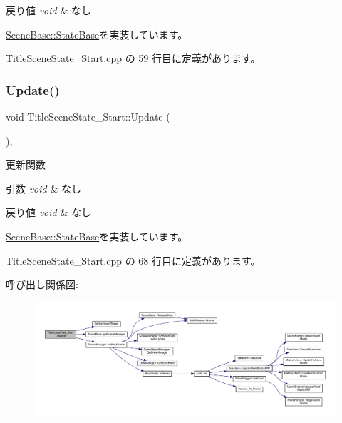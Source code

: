 \begin{DoxyRetVals}{戻り値}
{\em void} & なし \\
\hline
\end{DoxyRetVals}


\mbox{\hyperlink{class_scene_base_1_1_state_base_a2763fa37e45b39bd8d3bbb735c76c59b}{Scene\+Base\+::\+State\+Base}}を実装しています。



 Title\+Scene\+State\+\_\+\+Start.\+cpp の 59 行目に定義があります。

\mbox{\label{class_title_scene_state___start_a2e98cf6810711b58766d7147168d02eb}} 
\subsubsection{\texorpdfstring{Update()}{Update()}}
{\footnotesize\ttfamily void Title\+Scene\+State\+\_\+\+Start\+::\+Update (\begin{DoxyParamCaption}{ }\end{DoxyParamCaption})\hspace{0.3cm}{\ttfamily [override]}, {\ttfamily [virtual]}}



更新関数 


\begin{DoxyParams}{引数}
{\em void} & なし \\
\hline
\end{DoxyParams}

\begin{DoxyRetVals}{戻り値}
{\em void} & なし \\
\hline
\end{DoxyRetVals}


\mbox{\hyperlink{class_scene_base_1_1_state_base_ad2c6c8fd9f020eb02f64f394edee129c}{Scene\+Base\+::\+State\+Base}}を実装しています。



 Title\+Scene\+State\+\_\+\+Start.\+cpp の 68 行目に定義があります。

呼び出し関係図\+:
\nopagebreak
\begin{figure}[H]
\begin{center}
\leavevmode
\includegraphics[width=350pt]{class_title_scene_state___start_a2e98cf6810711b58766d7147168d02eb_cgraph}
\end{center}
\end{figure}


